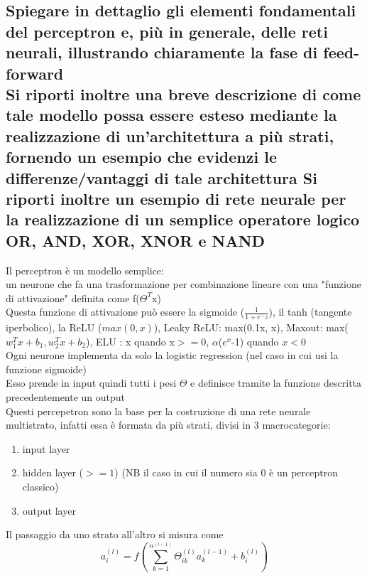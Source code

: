 \documentclass[10pt,oneside,a4paper]{article}
\begin{document}
	
	
	\subsection{Spiegare in dettaglio gli elementi fondamentali del perceptron e, più in generale, delle reti
		neurali, illustrando chiaramente la fase di feed-forward\\
		Si riporti inoltre una breve descrizione di come tale modello possa essere esteso
		mediante la realizzazione di un’architettura a più strati, fornendo un esempio che evidenzi
		le differenze/vantaggi di tale architettura
		Si riporti inoltre un esempio di rete neurale per la realizzazione di un semplice operatore
		logico OR, AND, XOR, XNOR e NAND}
	Il perceptron è un modello semplice:\\
	un neurone che fa una trasformazione per combinazione lineare con una "funzione di attivazione" definita come f($\Theta^T$x)\\
	Questa funzione di attivazione può essere la sigmoide ($\frac{1}{1+e^-z}$), il tanh (tangente iperbolico), la ReLU ($max(0,x)$), Leaky ReLU: max(0.1x, x), Maxout: max($w_1^Tx+b_1, w_2^Tx+b_2$), ELU : x quando x$>=0$, $\alpha$($e^x$-1) quando $x<0$\\
	Ogni neurone implementa da solo la logistic regression (nel caso in cui usi la funzione sigmoide)\\
	Esso prende in input quindi tutti i pesi $\Theta$ e definisce tramite la funzione descritta precedentemente un output\\
	Questi percepetron sono la base per la costruzione di una rete neurale multistrato, infatti essa è formata da più strati, divisi in 3 macrocategorie:
	\begin{enumerate}
		\item input layer
		\item hidden layer ($>=1$) (NB il caso in cui il numero sia 0 è un perceptron classico)
		\item output layer
	\end{enumerate}
	Il passaggio da uno strato all'altro si misura come
	\[
	a_i^{(l)} = f\left(\sum_{k=1}^{n^{(l-1)}} \Theta_{ik}^{(l)} a_k^{(l-1)} + b_i^{(l)}\right)
	\]
	
\end{document}
